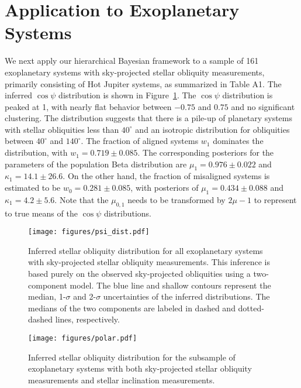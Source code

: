 \documentclass[twocolumn,times,linenumbers]{aastex631}
\begin{document}
\section{Application to Exoplanetary Systems}\label{sec:observation}

We next apply our hierarchical Bayesian framework to a sample of 161 exoplanetary systems with sky-projected stellar obliquity measurements, primarily consisting of Hot Jupiter systems, as summarized in \cite{Albrecht22} Table A1.
The inferred $\cos{\psi}$ distribution is shown in Figure~\ref{fig:psi_dist}. The $\cos{\psi}$ distribution is peaked at 1, with nearly flat behavior between $-0.75$ and $0.75$ and no significant clustering. The distribution suggests that there is a pile-up of planetary systems with stellar obliquities less than $40^\circ$ and an isotropic distribution for obliquities between $40^\circ$ and $140^\circ$.
The fraction of aligned systems $w_1$ dominates the distribution, with $w_1 = 0.719 \pm 0.085$. The corresponding posteriors for the parameters of the population Beta distribution are $\mu_1 = 0.976 \pm 0.022$ and $\kappa_1 = 14.1 \pm 26.6$. On the other hand, the fraction of misaligned systems is estimated to be $w_0 = 0.281 \pm 0.085$, with posteriors of $\mu_1 = 0.434 \pm 0.088$ and $\kappa_1 = 4.2 \pm 5.6$. Note that the $\mu_{0,1}$ needs to be transformed by $2\mu-1$ to represent to true means of the $\cos{\psi}$ distributions.

\begin{figure}[ht!]
    \begin{centering}
        \texttt{[image: figures/psi\_dist.pdf]}
        \caption{Inferred stellar obliquity distribution for all exoplanetary systems with sky-projected stellar obliquity measurements. This inference is based purely on the observed sky-projected obliquities using a two-component model. The blue line and shallow contours represent the median, 1-$\sigma$ and 2-$\sigma$ uncertainties of the inferred distributions. The medians of the two components are labeled in dashed and dotted-dashed lines, respectively.}
        \label{fig:psi_dist}
    \end{centering}
\end{figure}

\begin{figure*}[ht!]
    \begin{centering}
        \texttt{[image: figures/polar.pdf]}
        \caption{Inferred stellar obliquity distribution for the subsample of exoplanetary systems with both sky-projected stellar obliquity measurements and stellar inclination measurements.}
        \label{fig:polar}
    \end{centering}
\end{figure*}
\end{document}
